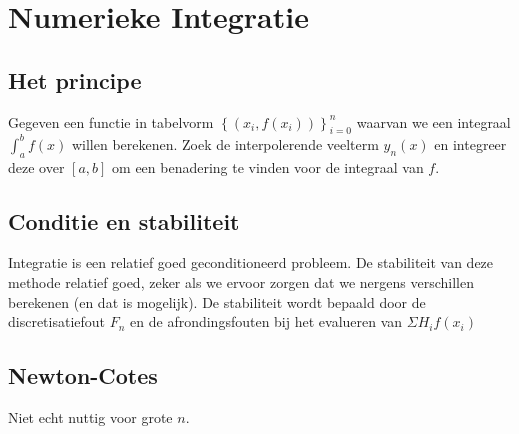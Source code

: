 \documentclass[samenvatting.tex]{subfiles}
\begin{document}
\chapter{Numerieke Integratie}
\section{Het principe}
Gegeven een functie in tabelvorm $\left\{ (x_i,f(x_i))\right\}_{i=0}^{n}$ waarvan we een integraal $\int_{a}^{b}f(x)$ willen berekenen. Zoek de interpolerende veelterm $y_n(x)$ en integreer deze over $[a,b]$ om een benadering te vinden voor de integraal van $f$.

\section{Conditie en stabiliteit}
Integratie is een relatief goed geconditioneerd probleem.
De stabiliteit van deze methode relatief goed, zeker als we ervoor zorgen dat we nergens verschillen berekenen (en dat is mogelijk).
De stabiliteit wordt bepaald door de discretisatiefout $F_n$ en de afrondingsfouten bij het evalueren van $\Sigma H_if(x_i)$

\section{Newton-Cotes}
Niet echt nuttig voor grote $n$.
\end{document}

